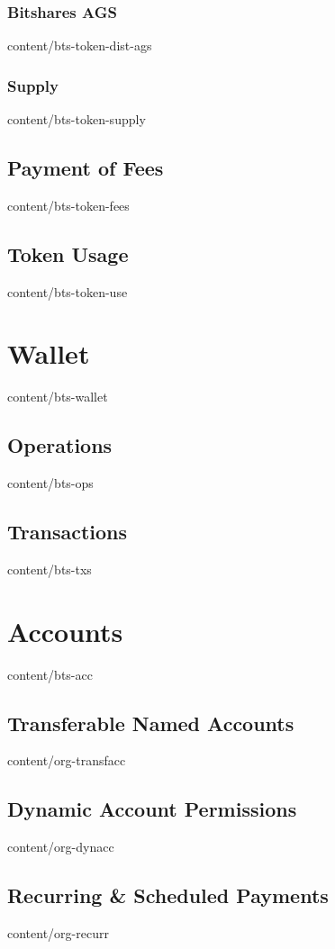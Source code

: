 \documentclass[conference,final,10pt,a4paper]{IEEEtran}
\begin{document}
\subsubsection { Bitshares AGS                   }  { content/bts-token-dist-ags } 
\subsubsection { Supply                          }  { content/bts-token-supply   } 
\subsection    { Payment of Fees                 }  { content/bts-token-fees     } 
\subsection    { Token Usage                     }  { content/bts-token-use      } 

\section       { Wallet                          }  { content/bts-wallet         } 
\subsection    { Operations                      }  { content/bts-ops            } 
\subsection    { Transactions                    }  { content/bts-txs            } 

\section       { Accounts                        }  { content/bts-acc            } 
\subsection    { Transferable Named Accounts     }  { content/org-transfacc      } 
\subsection    { Dynamic Account Permissions     }  { content/org-dynacc         } 
\subsection    { Recurring \& Scheduled Payments }  { content/org-recurr         } 
\end{document}
